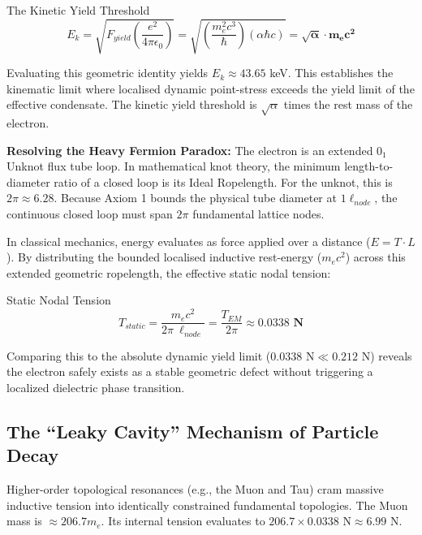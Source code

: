 \begin{resultbox}{The Kinetic Yield Threshold}
\begin{equation}
E_{k}=\sqrt{F_{yield}\left(\frac{e^{2}}{4\pi\epsilon_{0}}\right)}=\sqrt{\left(\frac{m_{e}^{2}c^{3}}{\hbar}\right)(\alpha\hbar c)}=\mathbf{\sqrt{\alpha}\cdot m_{e}c^{2}}
\end{equation}
\end{resultbox}

Evaluating this geometric identity yields $E_{k}\approx43.65$ keV. This establishes the kinematic limit where localised dynamic point-stress exceeds the yield limit of the effective condensate. The kinetic yield threshold is $\sqrt{\alpha}$ times the rest mass of the electron.

\textbf{Resolving the Heavy Fermion Paradox:} The electron is an extended $0_{1}$ Unknot flux tube loop. In mathematical knot theory, the minimum length-to-diameter ratio of a closed loop is its Ideal Ropelength. For the unknot, this is $2\pi \approx 6.28$. Because Axiom 1 bounds the physical tube diameter at $1\ell_{node}$, the continuous closed loop must span $2\pi$ fundamental lattice nodes.

In classical mechanics, energy evaluates as force applied over a distance ($E=T\cdot L$). By distributing the bounded localised inductive rest-energy ($m_{e}c^{2}$) across this extended geometric ropelength, the effective static nodal tension:

\begin{resultbox}{Static Nodal Tension}
\begin{equation}
T_{static}=\frac{m_{e}c^{2}}{2\pi\ \ell_{node}}=\frac{T_{EM}}{2\pi}\approx\mathbf{0.0338\text{ N}}
\end{equation}
\end{resultbox}

Comparing this to the absolute dynamic yield limit ($0.0338\text{ N}\ll0.212\text{ N}$) reveals the electron safely exists as a stable geometric defect without triggering a localized dielectric phase transition.

\subsection{The ``Leaky Cavity'' Mechanism of Particle Decay}

Higher-order topological resonances (e.g., the Muon and Tau) cram massive inductive tension into identically constrained fundamental topologies. The Muon mass is $\approx206.7m_{e}$. Its internal tension evaluates to $206.7\times0.0338\text{ N}\approx6.99\text{ N}$.

